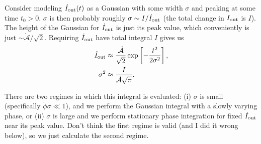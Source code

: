 \documentclass[11pt,
        usenames, %
        dvipsnames %
    ]{article}
\newcommand*{\rd}[2]{\frac{\mathrm{d}#1}{\mathrm{d}#2}}
\newcommand*{\rdil}[2]{\mathrm{d}#1 / \mathrm{d}#2}
\newcommand*{\bm}[1]{\boldsymbol{\mathbf{#1}}}
\newcommand*{\uv}[1]{\hat{\bm{#1}}}
\newcommand*{\at}[1]{\left.#1\right|}
\let\Im\undefined
\DeclareMathOperator{\Im}{Im}
\newcommand*{\p}[1]{\left(#1\right)}
\newcommand*{\s}[1]{\left[#1\right]}
\begin{document}
Consider modeling $\dot{I}_{\rm out}(t)$ as a Gaussian with some width $\sigma$
and peaking at some time $t_0 > 0$. $\sigma$ is then probably roughly $\sigma
\sim I / \dot{I}_{\rm out}$ (the total change in $I_{\rm out}$ is $I$).
The height of the Gaussian for $\dot{I}_{\rm out}$ is just its peak value, which
conveniently is just $\sim \dot{\mathcal{A}} / \sqrt{2}$. Requiring
$\dot{I}_{\rm out}$ have total integral $I$ gives us
\begin{align}
    \dot{I}_{\rm out} &\approx
        \frac{\dot{\mathcal{A}}}{\sqrt{2}}\exp\s{
            -\frac{t^2}{2\sigma^2}},\\
    \sigma^2 &\approx \frac{I}{\dot{\mathcal{A}}\sqrt{\pi}}.
\end{align}

There are two regimes in which this integral is evaluated: (i) $\sigma$ is small
(specifically $\dot{\phi}\sigma \ll 1$), and we perform the Gaussian integral
with a slowly varying phase, or (ii) $\sigma$ is large and we perform stationary
phase integration for fixed $\dot{I}_{\rm out}$ near its peak value. Don't think
the first regime is valid (and I did it wrong below), so we just calculate the
second regime.

\end{document}
